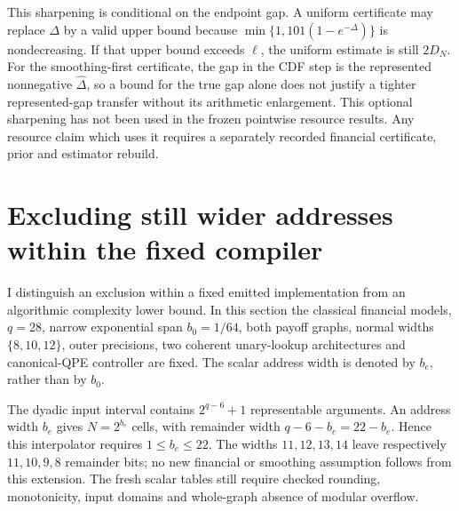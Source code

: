 \documentclass[11pt]{article}
\begin{document}
This sharpening is conditional on the endpoint gap. A uniform certificate
may replace $\Delta$ by a valid upper bound because
$\min\{1,101(1-e^{-\Delta})\}$ is nondecreasing. If that upper bound
exceeds $\ell$, the uniform estimate is still $2D_N$. For the
smoothing-first certificate, the gap in the CDF step is the represented
nonnegative $\widehat\Delta$, so a bound for the true gap alone does not
justify a tighter represented-gap transfer without its arithmetic
enlargement. This optional sharpening has not been used in the frozen
pointwise resource results. Any resource claim which uses it requires a
separately recorded financial certificate, prior and estimator rebuild.

\section{Excluding still wider addresses within the fixed compiler}
\label{sec:raw-wider-address-exclusion}

I distinguish an exclusion within a fixed emitted implementation from an
algorithmic complexity lower bound. In this section the classical financial
models, $q=28$, narrow exponential span $b_0=1/64$, both payoff graphs,
normal widths $\{8,10,12\}$, outer precisions, two coherent unary-lookup
architectures and canonical-QPE controller are fixed. The scalar address
width is denoted by $b_e$, rather than by $b_0$.

The dyadic input interval contains $2^{q-6}+1$ representable arguments.
An address width $b_e$ gives $N=2^{b_e}$ cells, with remainder width
$q-6-b_e=22-b_e$. Hence this interpolator requires $1\leq b_e\leq22$.
The widths $11,12,13,14$ leave respectively $11,10,9,8$ remainder bits;
no new financial or smoothing assumption follows from this extension.
The fresh scalar tables still require checked rounding, monotonicity,
input domains and whole-graph absence of modular overflow.
\end{document}
